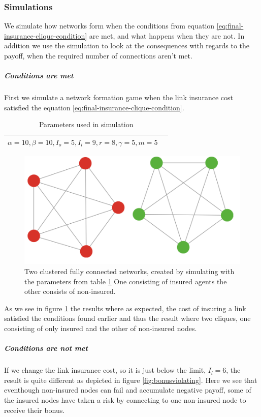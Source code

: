 \subsubsection{Simulations}
We simulate how networks form when the conditions from equation \ref{eq:final-insurance-clique-condition} are met, and what happens when they are not. In addition we use the simulation to look at the consequences with regards to the payoff, when the required number of connections aren't met. 

\subparagraph{Conditions are met}
First we simulate a network formation game when the link insurance cost satisfied the equation \ref{eq:final-insurance-clique-condition}. 
\begin{table}[h]
\centering
\begin{tabular}{lc}
 \hline
  $\alpha=10,
  \beta=10,
  I_{o}=5,
  I_{l}=9,
  r=8,
  \gamma=5,
  m=5
  $
  \\
  \hline
\end{tabular}
\caption{Parameters used in simulation \label{tbl:maxdegrevalues}}
\end{table}
\begin{figure}[h]
\centering
  \includegraphics[width=0.8\linewidth]{../Figures/BonusGameInsuredClique.png}
  \caption{\label{fig:bonusoptimal} Two clustered fully connected networks, created by simulating with the parameters from table \ref{tbl:maxdegrevalues} One consisting of insured agents the other consists of non-insured. }
\end{figure}
As we see in figure \ref{fig:bonusoptimal} the results where as expected, the cost of insuring a link satisfied the conditions found earlier and thus the result where two cliques, one consisting of only insured and the other of non-insured nodes.

\subparagraph{Conditions are not met}
If we change the link insurance cost, so it is just below the limit, $I_{l}=6$, the result is quite different as depicted in figure \ref{fig:bonusviolating}. Here we see that eventhough non-insured nodes can fail and accumulate negative payoff, some of the insured nodes have taken a risk by connecting to one non-insured node to receive their bonus. 

